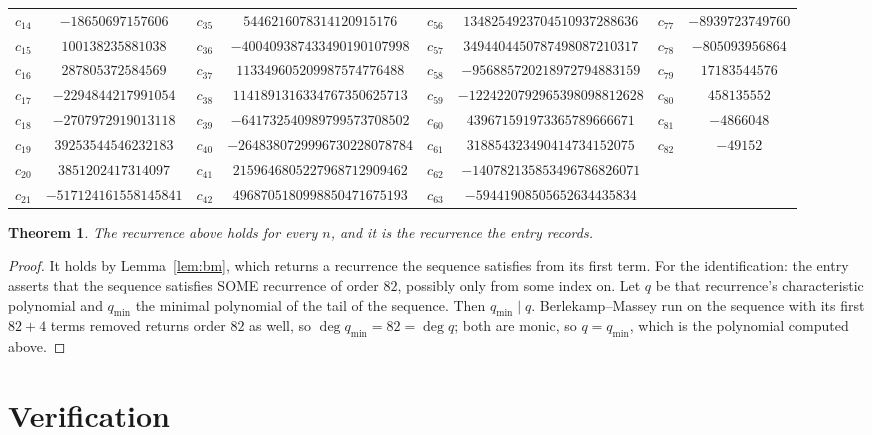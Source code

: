 \documentclass[11pt,a4paper]{article}
\theoremstyle{plain}
\newtheorem{theorem}{Theorem}
\theoremstyle{definition}
\begin{document}
\begin{center}
\begin{tabular}{cccccccc}
$c_{14}$ & $-18650697157606$ & $c_{35}$ & $5446216078314120915176$ & $c_{56}$ & $1348254923704510937288636$ & $c_{77}$ & $-8939723749760$ \\
$c_{15}$ & $100138235881038$ & $c_{36}$ & $-400409387433490190107998$ & $c_{57}$ & $3494404450787498087210317$ & $c_{78}$ & $-805093956864$ \\
$c_{16}$ & $287805372584569$ & $c_{37}$ & $113349605209987574776488$ & $c_{58}$ & $-956885720218972794883159$ & $c_{79}$ & $17183544576$ \\
$c_{17}$ & $-2294844217991054$ & $c_{38}$ & $1141891316334767350625713$ & $c_{59}$ & $-1224220792965398098812628$ & $c_{80}$ & $458135552$ \\
$c_{18}$ & $-2707972919013118$ & $c_{39}$ & $-641732540989799573708502$ & $c_{60}$ & $439671591973365789666671$ & $c_{81}$ & $-4866048$ \\
$c_{19}$ & $39253544546232183$ & $c_{40}$ & $-2648380729996730228078784$ & $c_{61}$ & $318854323490414734152075$ & $c_{82}$ & $-49152$ \\
$c_{20}$ & $3851202417314097$ & $c_{41}$ & $2159646805227968712909462$ & $c_{62}$ & $-140782135853496786826071$ &  &  \\
$c_{21}$ & $-517124161558145841$ & $c_{42}$ & $4968705180998850471675193$ & $c_{63}$ & $-59441908505652634435834$ &  &  \\
\end{tabular}
\end{center}

\begin{theorem}
The recurrence above holds for every $n$, and it is the recurrence the entry records.
\end{theorem}

\begin{proof}
It holds by Lemma~\ref{lem:bm}, which returns a recurrence the sequence satisfies from its
first term. For the identification: the entry asserts that the sequence satisfies SOME
recurrence of order $82$, possibly only from some index on. Let $q$ be that recurrence's
characteristic polynomial and $q_{\min}$ the minimal polynomial of the tail of the sequence.
Then $q_{\min}\mid q$. Berlekamp--Massey run on the sequence with its first $82+4$ terms
removed returns order $82$ as well, so $\deg q_{\min}=82=\deg q$; both are monic, so
$q=q_{\min}$, which is the polynomial computed above.
\end{proof}

\section{Verification}
\end{document}
